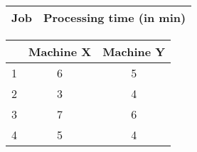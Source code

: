 \begin{center}
\begin{table}
    \centering
    \begin{tabular}[12pt]{cc}
    \hline
{Job} &  {Processing time (in min)} \\ \hline
    \end{tabular}
    
    \begin{tabular}[12pt]{c c c }
          & Machine X & Machine Y \\ \hline
1 & 6 & 5 \\ \hline
2 & 3 & 4 \\ \hline
3 & 7 & 6 \\ \hline
4 & 5 & 4 \\ \hline
    \end{tabular}
\end{table}
\end{center}